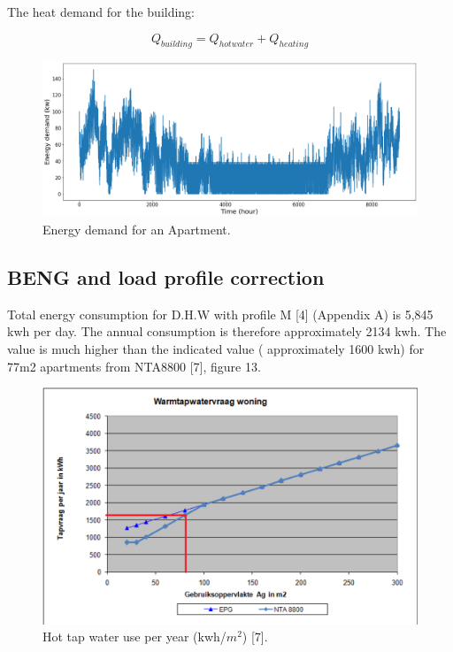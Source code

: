 \documentclass[a4paper,10pt]{article}
\begin{document}
The heat demand for the building:

\begin{equation}
Q_{building} = Q_{hotwater} + Q_{heating}
\end{equation}

\begin{figure}[H]
\centering
\includegraphics[width=1\columnwidth]{pictures/Q_building profile.png}
\caption[Short title]{Energy demand for an Apartment.}
\label{fig:ff12}\end{figure}

\subsection{BENG and load profile correction}

Total energy consumption for D.H.W with profile M [4] (Appendix A) is 5,845 kwh per day. The annual consumption is therefore approximately 2134 kwh. The value is much higher than the indicated value ( approximately 1600 kwh) for 77m2 apartments from NTA8800 [7], figure 13.

\begin{figure}[H]
\centering
\includegraphics[width=1\columnwidth]{pictures/NTA_8800_DHW.png}
\caption[Short title]{Hot tap water use per year (kwh/$m^2$) [7].}
\label{fig:ff13}\end{figure}
\end{document}

